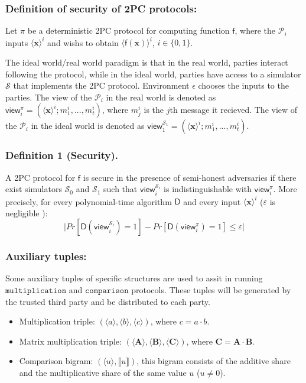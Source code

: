 \documentclass[letterpaper]{article} %
\begin{document}
    \subsubsection{Definition of security of 2PC protocols:}
    Let $\pi $ be a deterministic 2PC protocol for computing
    function $\mathsf{f}$,
    where the $\mathcal{P}_{i}$ inputs $\langle \mathbf{x}\rangle ^{i}$
    and wishs to obtain $\langle \mathsf{f}(\mathbf{x}) \rangle ^{i}$, $i \in \{0,1\}$.

    The ideal world/real world paradigm \cite{SecurityProof} is that
    in the real world, parties interact following the protocol,
    while in the ideal world, parties have access to a
    simulator $\mathcal{S}$ that implements the 2PC protocol.
    Environment $\epsilon $ chooses the
    inputs to the parties.
    The view of the $\mathcal{P}_{i}$ in the real world
    is denoted as $\mathsf{view}_{i}^{\pi}=(\langle \mathbf{x}\rangle ^{i};m^{i}_{1},...,m^{i}_{t})$,
    where $m^{i}_{j}$ is the $j$th message it recieved. The view of the $\mathcal{P}_{i}$ in the ideal world
    is denoted as $\mathsf{view}_{1}^{\mathcal{S}_{1}}=(\langle \mathbf{x}\rangle ^{i};m^{i}_{1},...,m^{i}_{t})$.

    \subsubsection{Definition 1 (Security).}
    A 2PC protocol for $\mathsf{f}$ is secure in the presence of semi-honest adversaries
    if there exist simulators $\mathcal{S}_{0}$ and $\mathcal{S}_{1}$ such that
    $\mathsf{view}_{i}^{\mathcal{S}_{i}}$ is indistinguishable with $\mathsf{view}_{i}^{\pi}$.
    More precisely,
    for every polynomial-time algorithm $\mathsf{D}$ and every input $\langle \mathbf{x}\rangle ^{i}$ ($\varepsilon $ is negligible ):
        $$\lvert Pr[\mathsf{D}(\mathsf{view}_{i}^{\mathcal{S}_{i}})=1]-Pr[\mathsf{D}(\mathsf{view}_{i}^{\pi})=1]\leq \varepsilon  \rvert $$


    \subsubsection{Auxiliary tuples:}
    Some auxiliary tuples of specific structures are used to
    assit in running $\mathtt{multiplication}$ and $\mathtt{comparison}$ protocols.
    These tuples will be generated by the trusted third party and be distributed to each party.
    \begin{itemize}
        \item Multiplication triple: $(\langle a\rangle,\langle b\rangle,\langle c\rangle)$, where $c=a\cdot b$.
        \item Matrix multiplication triple: $(\langle \mathbf{A}\rangle,\langle \mathbf{B}\rangle,\langle \mathbf{C}\rangle)$, where $\mathbf{C}=\mathbf{A}\cdot \mathbf{B}$.
        \item Comparison bigram: $(\langle u\rangle,\llbracket u \rrbracket)$,
        this bigram consists of the additive share and the multiplicative share of the same value $u$ ($u\neq 0 $).
    \end{itemize}
\end{document}
